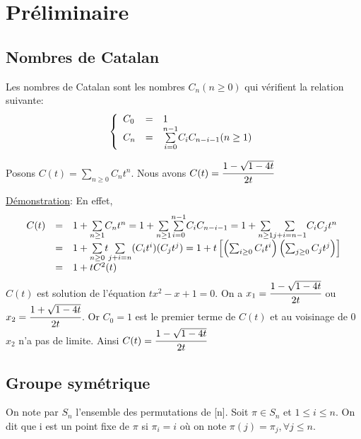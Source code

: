 \chapter{Préliminaire}

	\section{Nombres de Catalan}

		Les nombres de Catalan sont les nombres $C_{n} (n \geq 0)$ qui vérifient  la relation suivante:
		\[
			\left \{
				\begin{array}{l l l}
					C_{0} &=& 1\\
					C_{n} &=& \underset{i=0}{\overset{n-1}{\sum}}C_{i}C_{n-i-1} (n \geq 1)
				\end{array}
			\right.
		\]
		\begin{proposition}
			\begin{rm}
				Posons $C(t)=\underset{n \geq 0}{\sum}C_{n}t^n$. Nous avons $C(t)=\cfrac{1-\sqrt{1-4t}}{2t}$\\
			\end{rm}
		\end{proposition}

			\underline{Démonstration}: En effet,
			$$
			\begin{array}{r r l}
				C(t) &=& 1+\underset{n\geq1}{\sum}C_{n}t^n=1+ \underset{n\geq1}{\sum}\underset{i=0}{\overset{n-1}{\sum}}C_{i}C_{n-i-1} = 1+\underset{n\geq1}{\sum}\underset{j+i=n-1}{\sum}C_{i}C_{j}t^n \\

				&=& 1+\underset{n\geq0}{\sum}t\underset{j+i=n}{\sum}(C_{i}t^i)(C_{j}t^j)
				= 1 +t\left[\left(\sum_{i\geq0}C_{i}t^i\right)\left(\sum_{j\geq0}C_{j}t^j\right)\right]\\
				&=& 1+tC^2(t)
			\end{array}
			$$
			$C(t)$ est solution de l'équation $tx^2-x+1 = 0$. On a $x_{1}=\cfrac{1-\sqrt{1-4t}}{2t}$ ou $x_{2}=\cfrac{1+\sqrt{1-4t}}{2t}$. Or $C_{0}=1 $ est le premier terme de $C(t)$ et au voisinage de 0 $x_{2}$ n'a pas de limite. Ainsi $C(t)=\cfrac{1-\sqrt{1-4t}}{2t}$

	\section{Groupe symétrique}
		On note par $S_{n}$ l'ensemble des permutations de [n]. Soit $\pi \in S_{n}$ et $1 \leq i \leq n$. On dit que i est un point fixe de $\pi$ si $\pi_{i}=i$ où on note 
		$\pi(j) = \pi_{j}, \forall j \leq n$.

